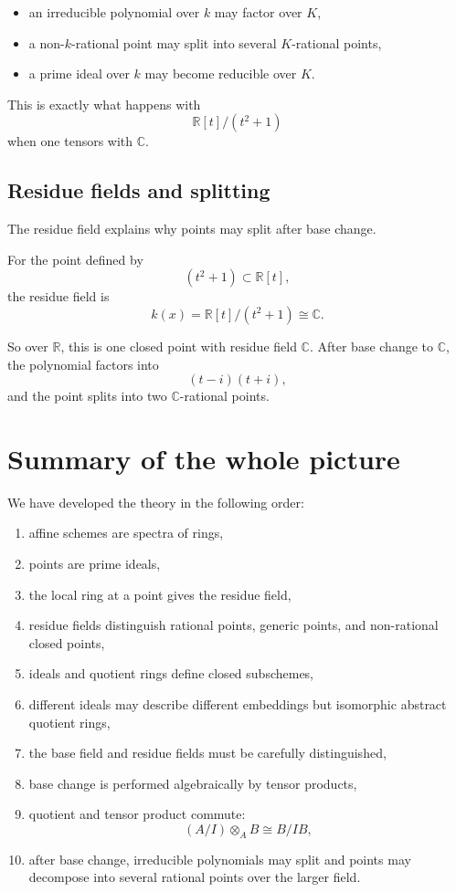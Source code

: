 \documentclass[12pt,a4paper]{article}
\theoremstyle{notespace}
\newcommand{\R}{\mathbb R}
\newcommand{\C}{\mathbb C}
\theoremstyle{definition}
\begin{document}
	\begin{itemize}[leftmargin=2em]
		\item an irreducible polynomial over \(k\) may factor over \(K\),
		\item a non-\(k\)-rational point may split into several \(K\)-rational points,
		\item a prime ideal over \(k\) may become reducible over \(K\).
	\end{itemize}
	
	This is exactly what happens with
	\[
	\R[t]/(t^2+1)
	\]
	when one tensors with \(\C\).
	
	\subsection{Residue fields and splitting}
	
	The residue field explains why points may split after base change.
	
	For the point defined by
	\[
	(t^2+1)\subset \R[t],
	\]
	the residue field is
	\[
	k(x)=\R[t]/(t^2+1)\cong \C.
	\]
	
	So over \(\R\), this is one closed point with residue field \(\C\).  
	After base change to \(\C\), the polynomial factors into
	\[
	(t-i)(t+i),
	\]
	and the point splits into two \(\C\)-rational points.
	
	\section{Summary of the whole picture}
	
	We have developed the theory in the following order:
	
	\begin{enumerate}[leftmargin=2em]
		\item affine schemes are spectra of rings,
		\item points are prime ideals,
		\item the local ring at a point gives the residue field,
		\item residue fields distinguish rational points, generic points, and non-rational closed points,
		\item ideals and quotient rings define closed subschemes,
		\item different ideals may describe different embeddings but isomorphic abstract quotient rings,
		\item the base field and residue fields must be carefully distinguished,
		\item base change is performed algebraically by tensor products,
		\item quotient and tensor product commute:
		\[
		(A/I)\otimes_A B \cong B/IB,
		\]
		\item after base change, irreducible polynomials may split and points may decompose into several rational points over the larger field.
	\end{enumerate}
	
\end{document}
